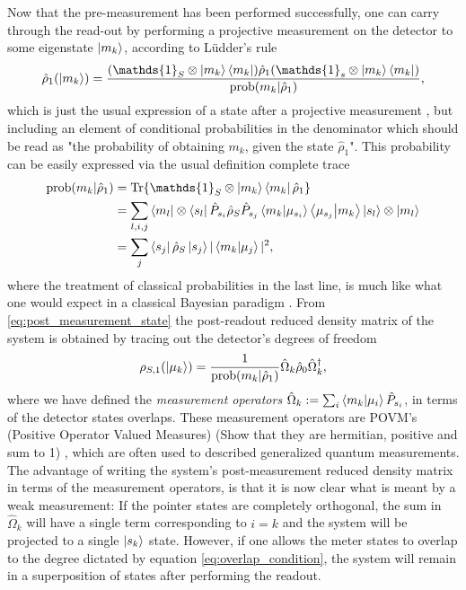 \documentclass{article}
\newcommand{\Id}{\mathds{1}}
\newcommand\sj[1]{ {\color{orange} #1} }
\begin{document}
Now that the pre-measurement has been performed successfully, one can carry through the read-out by performing 
a projective measurement on the detector to some eigenstate $\ket{m_k}$, according to Lüdder's rule 
\begin{align}\label{eq:post_measurement_state}
    \hat{\rho}_1(\ket{m_k}) = \frac{ (\Id_S \otimes \ket{m_k}\bra{m_k}) \hat{\rho}_1 
    (\Id_s \otimes \ket{m_k}\bra{m_k})}{\text{prob}(m_k|\hat{\rho}_1)},
\end{align} 
which is just the usual expression of a state after a projective measurement \cite{PreskillQuantum}, but 
including an element of conditional probabilities in the denominator which should be read as "the probability
of obtaining $m_k$, given the state $\hat{\rho}_1$". This probability can be easily expressed via the usual 
definition complete trace
\begin{align}
    \text{prob}(m_k|\hat{\rho}_1) & = \Tr{ \Id_S \otimes \ket{m_k}\bra{m_k}\hat{\rho}_1} \\ \nonumber 
            & = \sum_{l,i,j} \bra{m_l}\otimes\bra{s_l} \hat{P}_{s_i} \hat{\rho}_S \hat{P}_{s_{j}} 
            \bra{m_k}\ket{\mu_{s_i}}\bra{\mu_{s_j}} \ket{m_k}\ket{s_l}\otimes\ket{m_l} \nonumber \\ 
            & = \sum_{j} \bra{s_j} \hat{\rho}_{S}\ket{s_j} | \bra{m_k}\ket{\mu_j}|^2,
\end{align}
where the treatment of classical probabilities in the last line, is much like what one would expect in a 
classical Bayesian paradigm \cite{svenssonPedagogicalWeak2013}. From \eqref{eq:post_measurement_state} the post-readout reduced density matrix of the system is obtained by tracing out the detector's degrees of 
freedom
\begin{align}
    \rho_{S,1}(\ket{\mu_k}) = \frac{1}{\text{prob}(m_k|\hat{\rho}_1)} \hat{\Omega}_k \hat{\rho}_0 \hat{\Omega}_k^{\dagger},
\end{align}
where we have defined the \textit{measurement operators} $\hat{\Omega}_k :=\sum_{i} \bra{m_k}\ket{\mu_i} \hat{P}_{s_i}$, in terms of the detector states 
overlaps. These measurement operators are POVM's \cite{PreskillQuantum} (Positive Operator Valued
Measures)
\sj{(Show that they are hermitian, positive and sum to 1)}, which are often used to described
generalized quantum measurements. The advantage of writing 
the system's post-measurement reduced density matrix in terms of the
measurement operators, is that it is now clear what is meant by a weak measurement:
 If the pointer states are completely orthogonal,
the sum in $\hat{\Omega}_k$ will have a single term corresponding to $i=k$
and the system will be projected to a single $\ket{s_k}$ state. However,
if one allows the meter states to overlap to the degree dictated by equation \eqref{eq:overlap_condition}, the system will remain in a superposition of states after performing the readout. 
\end{document}
